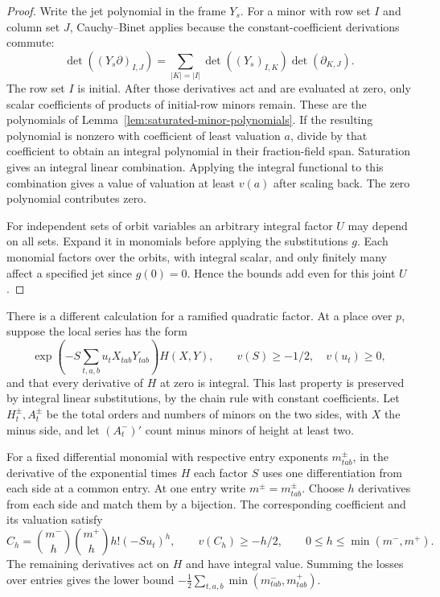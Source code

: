 \begin{proof}
Write the jet polynomial in the frame \(Y_s\).
For a minor with row set \(I\) and column set \(J\),
Cauchy--Binet applies because the constant-coefficient
derivations commute:
\[
    \det((Y_s\partial)_{I,J})
      =\sum_{|K|=|I|}\det((Y_s)_{I,K})\det(\partial_{K,J}).
\]
The row set \(I\) is initial. After those derivatives act and
are evaluated at zero, only scalar coefficients of products
of initial-row minors remain. These are the polynomials of
Lemma~\ref{lem:saturated-minor-polynomials}. If the resulting
polynomial is nonzero with coefficient of least valuation \(a\),
divide by that coefficient to obtain an integral polynomial
in their fraction-field span. Saturation gives an integral
linear combination. Applying the integral functional to this
combination gives a value of valuation at least \(v(a)\)
after scaling back. The zero polynomial contributes zero.

For independent
sets of orbit variables an arbitrary integral factor \(U\) may
depend on all sets. Expand it in monomials before applying the
substitutions \(g\). Each monomial factors over the orbits, with
integral scalar, and only finitely many affect a specified jet
since \(g(0)=0\). Hence the bounds add even for this joint \(U\).
\end{proof}

There is a different calculation for a ramified quadratic factor.
At a place over \(p\), suppose the local series has the form
\[
 \exp\!\left(-S\sum_{t,a,b}u_t X_{tab}Y_{tab}\right) H(X,Y),
 \qquad v(S)\ge-1/2,\quad v(u_t)\ge0 ,
\]
and that every derivative of \(H\) at zero is integral. This last
property is preserved by integral linear substitutions, by the
chain rule with constant coefficients. Let \(H^\pm_t,A^\pm_t\)
be the total orders and numbers of minors on the two sides,
with \(X\) the minus side, and let \((A^-_t)'\) count minus
minors of height at least two.

For a fixed differential monomial
with respective entry exponents \(m^\pm_{tab}\), in the
derivative of the exponential times \(H\) each factor \(S\)
uses one differentiation from each side at a common entry.
At one entry write \(m^\pm=m^\pm_{tab}\). Choose \(h\) derivatives
from each side and match them by a bijection. The corresponding
coefficient and its valuation satisfy
\[
 C_h=\binom{m^-}{h}\binom{m^+}{h}h!(-Su_t)^h,
 \qquad v(C_h)\ge -h/2,\qquad 0\le h\le\min(m^-,m^+).
\]
The remaining derivatives act on \(H\) and have integral value. Summing
the losses over entries gives the lower bound
\(-\frac12\sum_{t,a,b}\min(m^-_{tab},m^+_{tab})\).

